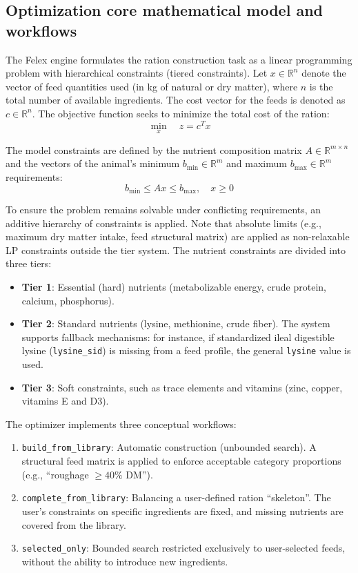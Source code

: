 \documentclass[a4paper,fleqn]{cas-dc}
\begin{document}
\subsection{Optimization core mathematical model and workflows}\label{subsec:optimization}

The Felex engine formulates the ration construction task as a linear programming problem with hierarchical constraints (tiered constraints). Let $x \in \mathbb{R}^n$ denote the vector of feed quantities used (in kg of natural or dry matter), where $n$ is the total number of available ingredients. The cost vector for the feeds is denoted as $c \in \mathbb{R}^n$. The objective function seeks to minimize the total cost of the ration:
\begin{equation}
\min_{x} \quad z = c^T x
\end{equation}

The model constraints are defined by the nutrient composition matrix $A \in \mathbb{R}^{m \times n}$ and the vectors of the animal's minimum $b_{\min} \in \mathbb{R}^m$ and maximum $b_{\max} \in \mathbb{R}^m$ requirements:
\begin{equation}
b_{\min} \leq A x \leq b_{\max}, \quad x \geq 0
\end{equation}

To ensure the problem remains solvable under conflicting requirements, an additive hierarchy of constraints is applied. Note that absolute limits (e.g., maximum dry matter intake, feed structural matrix) are applied as non-relaxable LP constraints outside the tier system. The nutrient constraints are divided into three tiers:
\begin{itemize}
    \item \textbf{Tier 1}: Essential (hard) nutrients (metabolizable energy, crude protein, calcium, phosphorus).
    \item \textbf{Tier 2}: Standard nutrients (lysine, methionine, crude fiber). The system supports fallback mechanisms: for instance, if standardized ileal digestible lysine (\texttt{lysine\_sid}) is missing from a feed profile, the general \texttt{lysine} value is used.
    \item \textbf{Tier 3}: Soft constraints, such as trace elements and vitamins (zinc, copper, vitamins E and D3).
\end{itemize}

The optimizer implements three conceptual workflows:
\begin{enumerate}
    \item \texttt{build\_from\_library}: Automatic construction (unbounded search). A structural feed matrix is applied to enforce acceptable category proportions (e.g., ``roughage $\geq 40\%$ DM'').
    \item \texttt{complete\_from\_library}: Balancing a user-defined ration ``skeleton''. The user's constraints on specific ingredients are fixed, and missing nutrients are covered from the library.
    \item \texttt{selected\_only}: Bounded search restricted exclusively to user-selected feeds, without the ability to introduce new ingredients.
\end{enumerate}
\end{document}
